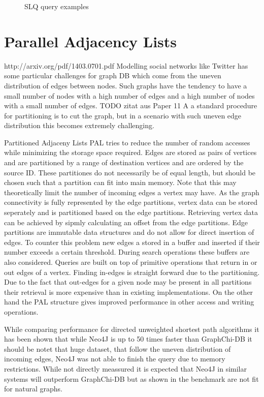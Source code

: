 \documentclass{sig-alternate}
\begin{document}
\begin{figure}
\centering
{}
\caption{SLQ query examples}
\label{fig:slqexample}
\end{figure}

\section{Parallel Adjacency Lists}
http://arxiv.org/pdf/1403.0701.pdf
Modelling social networks like Twitter has some particular challenges
for graph DB which come from the uneven distribution of edges between nodes.
Such graphs have the tendency to have a small number of nodes with a high number of edges
and a high number of nodes with a small number of edges. TODO zitat aus Paper 11
A a standard procedure for partitioning is to cut the graph, but in 
a scenario with such uneven edge distribution this becomes extremely challenging.

Partitioned Adjaceny Lists PAL tries to reduce the number of random accesses while minimizing the storage
space required. Edges are stored as pairs of vertices and are partitioned by a range of destination
vertices and are ordered by the source ID. These partitiones do not necessarily be of equal length, but should 
be chosen such that a partition can fit into main memory. Note that this may theoretically limit the number of
incoming edges a vertex may have.
As the graph connectivity is fully represented 
by the edge partitions, vertex data can be stored seperately and is partitioned 
based on the edge partitions. Retrieving vertex data can be achieved by sipmly calculating an offset from
the edge partitions.
Edge partitions are immutable data structures and do not allow for direct insertion of edges. 
To counter this problem new edges a stored in a buffer and inserted if their number exceeds a certain threshold.
During search operations these buffers are also considered.
Queries are built on top of primitive operations that return in or out edges of a vertex.
Finding in-edges is straight forward due to the partitioning. Due to the fact that out-edges
for a given node may be present in all partitions their retrieval is more expensive than
in existing implementations. On the other hand the PAL structure gives improved performance in other access and writing operations.

While comparing performance for directed unweighted shortest path algorithms it has been shown that while Neo4J
is up to 50 times faster than GraphChi-DB it should be notet that huge dataset, that follow the uneven distribution 
of incoming edges, Neo4J was not able to finish the query due to memory restrictions.
While not directly meassured it is expected that Neo4J in similar systems will outperform 
GraphChi-DB but as shown in the benchmark are not fit for natural graphs.
\end{document}
